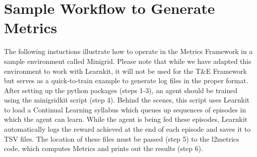 \section{Sample Workflow to Generate Metrics}

The following instuctions illustrate how to operate in the Metrics Framework in a sample environment called Minigrid. Please note that while we have adapted this environment to work with Learnkit, it will not be used for the T\&E Framework but serves as a quick-to-train example to generate log files in the proper format. After setting up the python packages (steps 1-3), an agent should be trained using the minigridkit script (step 4). Behind the scenes, this script uses Learnkit to load a Continual Learning syllabus which queues up sequences of episodes in which the agent can learn. While the agent is being fed these episodes, Learnkit automatically logs the reward achieved at the end of each episode and saves it to TSV files. The location of these files must be passed (step 5) to the l2metrics code, which computes Metrics and prints out the results (step 6). \\[0.2in]

